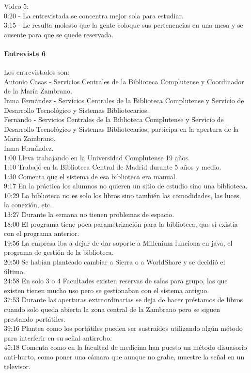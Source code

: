 \documentclass[12pt]{article}
\begin{document}
 Video 5: \\
0:20 - La entrevistada se concentra mejor sola para estudiar.\\ 
3:15 - Le resulta molesto que la gente coloque sus pertenencias en una mesa y se ausente para que se quede reservada. \\


\paragraph{Entrevista 6}
Los entrevistados son:\\
Antonio Casas - Servicios Centrales de la Biblioteca Complutense y Coordinador de la María Zambrano.\\
Inma Fernández - Servicios Centrales de la Biblioteca Complutense y Servicio de Desarrollo Tecnológico y Sistemas Bibliotecarios.\\
Fernando - Servicios Centrales de la Biblioteca Complutense y Servicio de Desarrollo Tecnológico y Sistemas Bibliotecarios, participa en la apertura de la Maria Zambrano.\\

Inma Fernández.\\
1:00 Lleva trabajando en la Universidad Complutense 19 años.\\
1:10 Trabajó en la Biblioteca Central de Madrid durante 5 años y medio.\\
1:30 Comenta que el sistema de esa biblioteca era manual.\\
9:17 En la práctica los alumnos no quieren un sitio de estudio sino una biblioteca.\\
10:29 La biblioteca no es solo los libros sino también las comodidades, las luces, la conexión, etc.\\
13:27 Durante la semana no tienen problemas de espacio.\\
18:00 El programa tiene poca parametrización para la biblioteca, que sí existía con el programa anterior.\\
19:56 La empresa iba a dejar de dar soporte a Millenium funciona en java, el programa de gestión de la biblioteca.\\
20:50 Se habían planteado cambiar a Sierra o a WorldShare y se decidió el último.\\
24:58 En solo 3 o 4 Facultades existen reservas de salas para grupo, las que existen tienen mucho uso pero se gestionaban con el sistema antiguo.\\
37:53 Durante las aperturas extraordinarias se deja de hacer préstamos de libros cuando solo queda abierta la zona central de la Zambrano pero se siguen prestando portátiles.\\
39:16 Plantea como los portátiles pueden ser sustraídos utilizando algún método para interferir en su señal antirrobo.\\
45:18 Comenta como en la facultad de medicina han puesto un método disuasorio anti-hurto, como poner una cámara que aunque no grabe, muestre la señal en un televisor.\\
\end{document}
